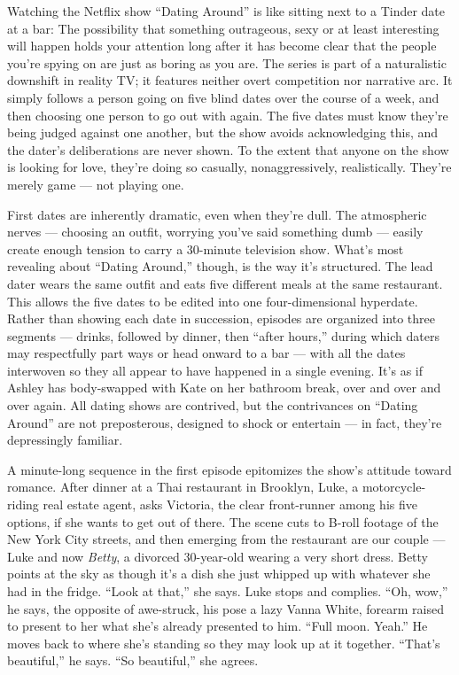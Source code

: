 Watching the Netflix show ``Dating Around'' is like sitting next to a
Tinder date at a bar: The possibility that something outrageous, sexy or
at least interesting will happen holds your attention long after it has
become clear that the people you're spying on are just as boring as you
are. The series is part of a naturalistic downshift in reality TV; it
features neither overt competition nor narrative arc. It simply follows
a person going on five blind dates over the course of a week, and then
choosing one person to go out with again. The five dates must know
they're being judged against one another, but the show avoids
acknowledging this, and the dater's deliberations are never shown. To
the extent that anyone on the show is looking for love, they're doing so
casually, nonaggressively, realistically. They're merely game --- not
playing one.

First dates are inherently dramatic, even when they're dull. The
atmospheric nerves --- choosing an outfit, worrying you've said
something dumb --- easily create enough tension to carry a 30-minute
television show. What's most revealing about ``Dating Around,'' though,
is the way it's structured. The lead dater wears the same outfit and
eats five different meals at the same restaurant. This allows the five
dates to be edited into one four-dimensional hyperdate. Rather than
showing each date in succession, episodes are organized into three
segments --- drinks, followed by dinner, then ``after hours,'' during
which daters may respectfully part ways or head onward to a bar --- with
all the dates interwoven so they all appear to have happened in a single
evening. It's as if Ashley has body-swapped with Kate on her bathroom
break, over and over and over again. All dating shows are contrived, but
the contrivances on ``Dating Around'' are not preposterous, designed to
shock or entertain --- in fact, they're depressingly familiar.

A minute-long sequence in the first episode epitomizes the show's
attitude toward romance. After dinner at a Thai restaurant in Brooklyn,
Luke, a motorcycle-riding real estate agent, asks Victoria, the clear
front-runner among his five options, if she wants to get out of there.
The scene cuts to B-roll footage of the New York City streets, and then
emerging from the restaurant are our couple --- Luke and now
\emph{Betty}, a divorced 30-year-old wearing a very short dress. Betty
points at the sky as though it's a dish she just whipped up with
whatever she had in the fridge. ``Look at that,'' she says. Luke stops
and complies. ``Oh, wow,'' he says, the opposite of awe-struck, his pose
a lazy Vanna White, forearm raised to present to her what she's already
presented to him. ``Full moon. Yeah.'' He moves back to where she's
standing so they may look up at it together. ``That's beautiful,'' he
says. ``So beautiful,'' she agrees.

